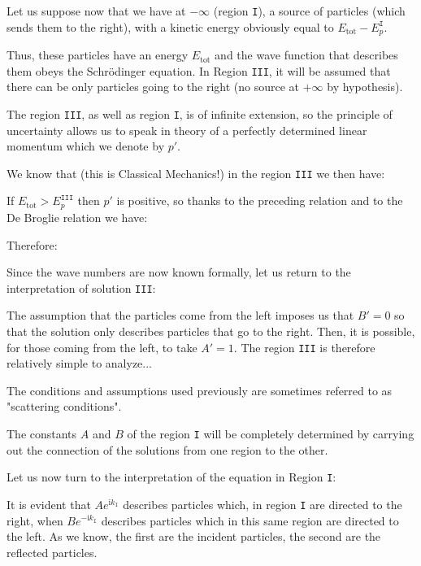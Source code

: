 	Let us suppose now that we have at $-\infty$ (region \texttt{I}), a source of particles (which sends them to the right), with a kinetic energy obviously equal to $E_{\text{tot}}-E_{p}^{\texttt{I}}$.
	
	Thus, these particles have an energy $E_\text{tot}$ and the wave function that describes them obeys the Schrödinger equation. In Region \texttt{III}, it will be assumed that there can be only particles going to the right (no source at $+\infty$ by hypothesis).

	The region \texttt{III}, as well as region \texttt{I}, is of infinite extension, so the principle of uncertainty allows us to speak in theory of a perfectly determined linear momentum which we denote by $p'$.

	We know that (this is Classical Mechanics!) in the region \texttt{III} we then have:
	
	If $E_\text{tot}>E_p^{\texttt{III}}$ then $p'$ is positive, so thanks to the preceding relation and to the De Broglie relation we have:
	
	Therefore:
	
	Since the wave numbers are now known formally, let us return to the interpretation of solution \texttt{III}:
	
	The assumption that the particles come from the left imposes us that $B'=0$ so that the solution only describes particles that go to the right. Then, it is possible, for those coming from the left, to take $A'=1$. The region \texttt{III} is therefore relatively simple to analyze...
	
	\begin{tcolorbox}[title=Remark,colframe=black,arc=10pt]
	The conditions and assumptions used previously are sometimes referred to as "scattering conditions".
	\end{tcolorbox}
	The constants $A$ and $B$ of the region \texttt{I} will be completely determined by carrying out the connection of the solutions from one region to the other.

	Let us now turn to the interpretation of the equation in Region \texttt{I}:
	
	It is evident that $Ae^{\mathrm{i}k_{\texttt{I}}}$ describes particles which, in region \texttt{I} are directed to the right, when $Be^{-\mathrm{i}k_{\texttt{I}}}$ describes particles which in this same region are directed to the left. As we know, the first are the incident particles, the second are the reflected particles.
	
